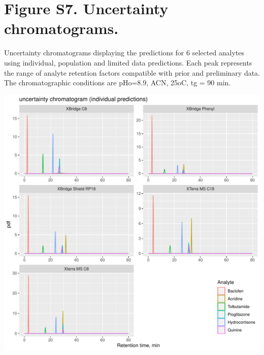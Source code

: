 \documentclass[
]{article}
\begin{document}
\newpage{}

\hypertarget{figure-s7.-uncertainty-chromatograms.}{%
\section{Figure S7. Uncertainty
chromatograms.}\label{figure-s7.-uncertainty-chromatograms.}}

Uncertainty chromatograms displaying the predictions for 6 selected
analytes using individual, population and limited data predictions. Each
peak represents the range of analyte retention factors compatible with
prior and preliminary data. The chromatographic conditions are pHo=8.9,
ACN, 25oC, tg = 90 min.

\includegraphics{../figures/concordanceplots/uncertainitychromatogram.individual.pdf}

\newpage{}
\end{document}
